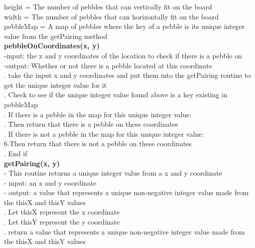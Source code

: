 \documentclass[12pt]{article}
\begin{document}
\begin{paragraph}
\indent height = The number of pebbles that can vertically fit on the board\\
\indent width = The number of pebbles that can horizontally fit on the board\\
\indent pebbleMap = A map of pebbles where the key of a pebble is its unique integer value from the getPairing method\\
\linebreak
\indent \textbf{pebbleOnCoordinates(x, y)}\\
\indent	-input: the x and y coordinates of the location to check if there is a pebble on\\
\indent	-output: Whether or not there is a pebble located at this coordinate\\
\linebreak
\indent{}. take the input x and y coordinates and put them into the getPairing routine to get the unique integer value for it\\
\indent{}. Check to see if the unique integer value found above is a key existing in pebbleMap\\
\indent{}. If there is a pebble in the map for this unique integer value:\\
\indent\indent{}. Then return that there is a pebble on these coordinates\\
\indent{}. If there is not a pebble in the map for this unique integer value:\\
\indent\indent\indent 6.Then return that there is not a pebble on these coordinates\\
\indent{}. End if\\
\linebreak
\indent \textbf{getPairing(x, y)}\\
\indent - This routine returns a unique integer value from a x and y coordinate\\
\indent - input: an x and y coordinate\\
\indent - output: a value that represents a unique non-negative integer value made from the thisX and thisY values\\
\linebreak
\indent{}. Let thisX represent the x coordinate\\
\indent{}. Let thisY represent the y coordinate\\
\indent{}. return a value that represents a unique non-negative integer value made from the thisX and thisY values\\
\end{paragraph}
\end{document}
